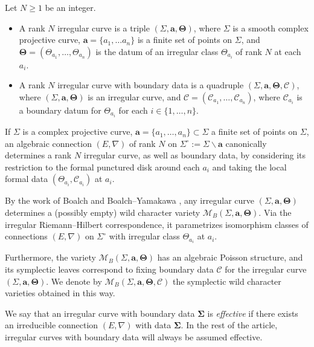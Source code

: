 \documentclass[11pt,a4paper]{amsart}
\numberwithin{equation}{section}
\begin{document}
\begin{definition} Let $N\geq 1$ be an integer.
\begin{itemize}
\item 
A rank $N$ irregular curve is a triple $(\Sigma, \mathbf a, \bm\Theta)$, where $\Sigma$ is a smooth complex projective curve, $\mathbf a =\{a_1, \dots a_n\}$ is a finite set of points on $\Sigma$, and $\bm\Theta=(\Theta_{a_1}, \dots, \Theta_{a_n})$ is the datum of an irregular class $\Theta_{a_i}$ of rank $N$ at each $a_i$. 
\item
A rank $N$ irregular curve with boundary data is a quadruple $(\Sigma, \mathbf a, \bm\Theta, \bm{\mathcal C})$, where $(\Sigma, \mathbf a, \bm\Theta)$ is an irregular curve, and $\bm{\mathcal C}=(\mathcal C_{a_1}, \dots, \mathcal C_{a_n})$, where $\mathcal C_{a_i}$ is a boundary datum for $\Theta_{a_i}$ for each $i\in \{1, \dots, n\}$.
\end{itemize}
\end{definition}


If $\Sigma$ is a complex projective curve,  $\mathbf a=\{a_1, \dots, a_n\}\subset \Sigma$ a finite set of points on $\Sigma$,  an algebraic connection $(E,\nabla)$ of rank $N$ on $\Sigma^{\circ}:=\Sigma\smallsetminus \mathbf a$ canonically determines a rank $N$ irregular curve, as well as boundary data, by considering its restriction to the formal punctured disk around each $a_i$ and taking the local formal data $(\Theta_{a_i}, \mathcal C_{a_i})$ at $a_i$. 




By the work of Boalch and Boalch--Yamakawa \cite{boalch2014geometry, boalch2015twisted}, any irregular curve $(\Sigma, \mathbf a, \bm\Theta)$ determines a (possibly empty) wild character variety $\mathcal M_B(\Sigma, \mathbf a, \bm\Theta)$. Via the irregular Riemann--Hilbert correspondence, it parametrizes isomorphism classes of connections $(E,\nabla)$ on $\Sigma^\circ$ with irregular class $\Theta_{a_i}$ at $a_i$.

Furthermore, the variety $\mathcal M_B(\Sigma, \mathbf a, \bm\Theta)$ has an algebraic Poisson structure, and its symplectic leaves correspond to fixing boundary data $\bm{\mathcal C}$ for the irregular curve $(\Sigma, \mathbf a, \bm\Theta)$. We denote by $\mathcal M_B(\Sigma, \mathbf a, \bm\Theta, \bm{\mathcal C})$ the symplectic wild character varieties obtained in this way.

\begin{remark}
We say that an irregular curve with boundary data $\bm\Sigma$ is \emph{effective} if there exists an irreducible connection $(E,\nabla)$ with data $\bm\Sigma$. In the rest of the article, irregular curves with boundary data will always be assumed effective.
\end{remark}
\end{document}
